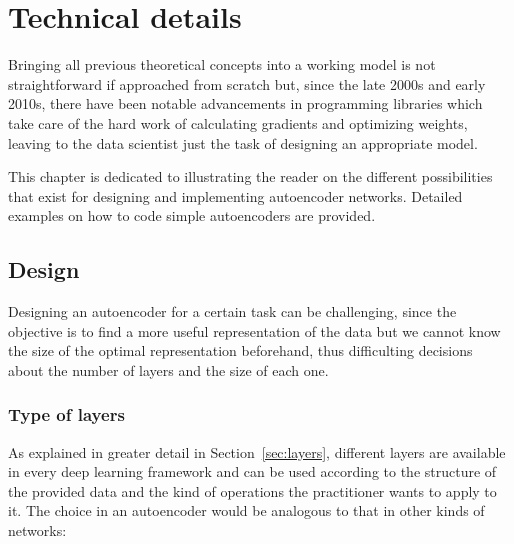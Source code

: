 \setchapterpreamble[u]{\margintoc}
\chapter{Technical details}

Bringing all previous theoretical concepts into a working model is not straightforward if approached from scratch but, since the late 2000s and early 2010s, there have been notable advancements in programming libraries which take care of the hard work of calculating gradients and optimizing weights, leaving to the data scientist just the task of designing an appropriate model.

This chapter is dedicated to illustrating the reader on the different possibilities that exist for designing and implementing autoencoder networks. Detailed examples on how to code simple autoencoders are provided.

\section{Design}

Designing an autoencoder for a certain task can be challenging, since the objective is to find a more useful representation of the data but we cannot know the size of the optimal representation beforehand, thus difficulting decisions about the number of layers and the size of each one.

\subsection{Type of layers}

As explained in greater detail in Section~\ref{sec:layers}, different layers are available in every deep learning framework and can be used according to the structure of the provided data and the kind of operations the practitioner wants to apply to it. The choice in an autoencoder would be analogous to that in other kinds of networks:

